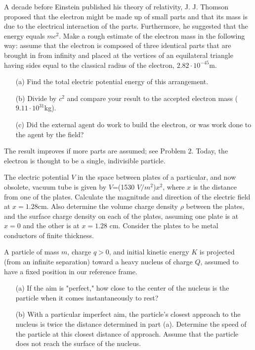 \documentclass[11pt,letterpaper,boxed]{pset}
\begin{document}
    \begin{problem} [*E28.3]
    A decade before Einstein published his theory of relativity, J. J. Thomson proposed that the electron might be made up of small parts and that its mass is due to the electrical interaction of the parts. Furthermore, he suggested that the energy equals $mc^2$. Make a rough estimate of the electron mass in the following way: assume that the electron is composed of three identical parts that are brought in from inﬁnity and placed at the vertices of an equilateral triangle having sides equal to the classical radius of the electron, $2.82\cdot10^{-45}$m. 
    \begin{itemize}
        \item [(a)] Find the total electric potential energy of this arrangement. 
        \item [(b)] Divide by $c^2$ and compare your result to the accepted electron mass ($9.11\cdot10^{31}$kg).
        \item [(c)] Did the external agent do work to build the electron, or was work done to the agent by the field?
    \end{itemize}
    The result improves if more parts are assumed; see Problem 2. Today, the electron is thought to be a single, indivisible particle.
    \end{problem}
    \newpage
    
    \begin{problem} [SUP 3A/E28.35]
    The electric potential $V$ in the space between plates of a particular, and now obsolete, vacuum tube is given by $V$=(1530 $V/m^2$)$x^2$, where $x$ is the distance from one of the plates. Calculate the magnitude and direction of the electric field at $x=1.28$cm. Also determine the volume charge density $\rho$ between the plates, and the surface charge density on each of the plates, assuming one plate is at $x = 0$ and the other is at $x = 1.28$ cm. Consider the plates to be metal conductors of finite thickness.
    \end{problem}
    \newpage
    
    \begin{problem} [P28.6]
    A particle of mass $m$, charge $q > 0$, and initial kinetic energy $K$ is projected (from an infinite separation) toward a heavy nucleus of charge $Q$, assumed to have a fixed position in our reference frame.
    
    \begin{itemize}
        \item [(a)] If the aim is "perfect," how close to the center of the nucleus is the particle when it comes instantaneously to rest?
        \item [(b)] With a particular imperfect aim, the particle's closest approach to the nucleus is twice the distance determined in part (a). Determine the speed of the particle at this closest distance of approach. Assume that the particle does not reach the surface of the nucleus.
    \end{itemize}
    \end{problem}
    \newpage
    
\end{document}
